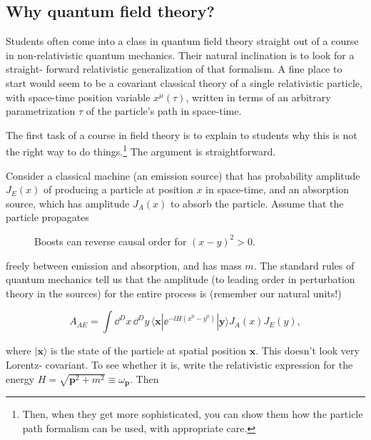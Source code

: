 \subsection{Why quantum field theory?}

Students often come into a class in quantum field theory straight out of a course in
non-relativistic quantum mechanics. Their natural inclination is to look for a straight-
forward relativistic generalization of that formalism. A fine place to start would seem to
be a covariant classical theory of a single relativistic particle, with space-time position
variable $x^\mu(\tau)$, written in terms of an arbitrary parametrization $\tau$ of the particle's path
in space-time.

The first task of a course in field theory is to explain to students why this is not the
right way to do things.\footnote[1]{Then, when they get more sophisticated, you can show them how the particle path formalism can be used, with appropriate care.} The argument is straightforward.

Consider a classical machine (an emission source) that has probability amplitude
$J_E(x)$ of producing a particle at position $x$ in space-time, and an absorption source,
which has amplitude $J_A(x)$ to absorb the particle. Assume that the particle propagates

\begin{figure}[htbp]
  \centering
  
  \caption{Boosts can reverse causal order for $(x-y)^2>0$.}
  \label{fig:1.1}
\end{figure}

freely between emission and absorption, and has mass $m$. The standard rules of quantum
mechanics tell us that the amplitude (to leading order in perturbation theory in the
sources) for the entire process is (remember our natural units!)

\begin{equation}
  A_{AE}=\int\dd^D x\,\dd^D y\,\langle\mathbf x|\ee^{-\ii H(x^0-y^0)}|\mathbf y\rangle J_A(x)J_E(y),
  \label{eq:1.1}
\end{equation}

where $|\mathbf x\rangle$ is the state of the particle at spatial position $\mathbf x$. This doesn't look very Lorentz-
covariant. To see whether it is, write the relativistic expression for the energy $H=
\sqrt{\mathbf p^2+m^2}\equiv\omega_{\mathbf p}$. Then

